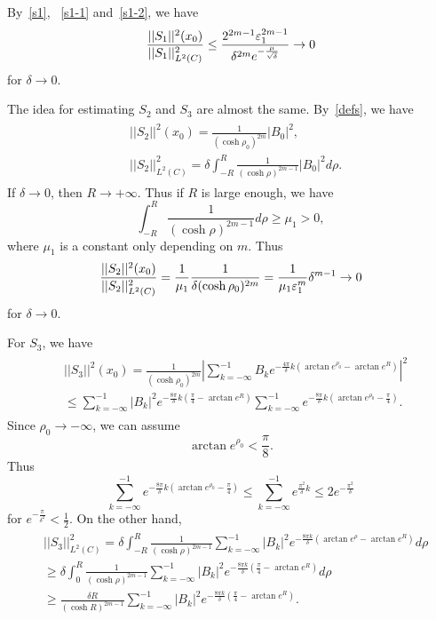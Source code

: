 By~\eqref{s1}, ~\eqref{s1-1} and~\eqref{s1-2}, we have
\begin{equation}\label{s1-c}
\frac{||S_1||^2(x_0)}{||S_1||^2_{L^2(C)}}
\leq\frac{2^{2m-1}\varepsilon_1^{2m-1}}{\delta^{2m}e^{-\frac{\mu}{\sqrt{\delta}}}}
\rightarrow 0
\end{equation}
for $\delta\rightarrow 0$.


The idea for estimating $S_2$ and $S_3$ are almost the same. 
By~\eqref{defs}, we have
\begin{align}\label{s2}
\begin{split}
& ||S_2||^2(x_0)=\frac{1}{(\cosh\rho_0)^{2m}}|B_0|^2,\\
&||S_2||^2_{L^2(C)}=\delta\int^R_{-R}
\frac{1}{(\cosh\rho)^{2m-1}}|B_0|^2 d\rho.
\end{split}
\end{align}
If $\delta\rightarrow 0$, then $R\rightarrow +\infty$. Thus if
$R$ is large enough, we have
\[
\int_{-R}^R\frac{1}{(\cosh\rho)^{2m-1}} d\rho\geq\mu_1>0,
\]
where $\mu_1$ is a constant only depending on $m$. Thus
\begin{equation}\label{s2-c}
\frac{||S_2||^2(x_0)}{||S_2||^2_{L^2(C)}}=\frac{1}{\mu_1}
\frac{1}{\delta(\cosh\rho_0)^{2m}}
=\frac{1}{\mu_1\varepsilon_1^m}\delta^{m-1}\rightarrow 0
\end{equation}
for $\delta\rightarrow 0$.

For $S_3$, we have
\begin{align}\label{s3}
\begin{split}
&||S_3||^2(x_0)=\frac{1}{(\cosh\rho_0)^{2m}}
|\sum_{k=-\infty}^{-1}B_ke^{-\frac{4\pi}{\delta}k
(\arctan e^{\rho_0}-\arctan e^R)}|^2\\
&\leq\sum_{k=-\infty}^{-1}|B_k|^2 e^{-\frac{8\pi}{\delta}k(\frac\pi
4-\arctan e^R)}
\sum_{k=-\infty}^{-1} e^{-\frac{8\pi}{\delta}k(\arctan e^{\rho_0}-
\frac\pi 4)}.
\end{split}
\end{align}
Since $\rho_0\rightarrow -\infty$, we can assume
\[
\arctan e^{\rho_0}<\frac{\pi}{8}.
\]
Thus
\begin{equation}\label{s3-1}
\sum_{k=-\infty}^{-1} e^{-\frac{8\pi}{\delta}k(\arctan e^{\rho_0}-\frac\pi
4)}
\leq\sum_{k=-\infty}^{-1}e^{\frac{\pi^2}{\delta}k}
\leq 2e^{-\frac{\pi^2}{\delta}}
\end{equation}
for $e^{-\frac{\pi}{\delta^2}}<\frac 12$.
On the other hand,
\begin{align}\label{s3-2}
\begin{split}
&||S_3||^2_{L^2(C)}=\delta
\int_{-R}^R\frac{1}{(\cosh\rho)^{2m-1}}\sum_{k=-\infty}^{-1}
|B_k|^2 e^{-\frac{8\pi k}{\delta}(\arctan e^\rho-\arctan e^R)} d\rho\\
&\geq \delta\int^R_0\frac{1}{(\cosh\rho)^{2m-1}}
\sum_{k=-\infty}^{-1}|B_k|^2 e^{-\frac{8\pi k}{\delta}(\frac\pi 4-\arctan
e^R)} d\rho\\
&\geq\frac{\delta R}{(\cosh R)^{2m-1}}\sum_{k=-\infty}^{-1}
|B_k|^2 e^{-\frac{8\pi k}{\delta}(\frac\pi 4-\arctan e^R)}.
\end{split}
\end{align}

